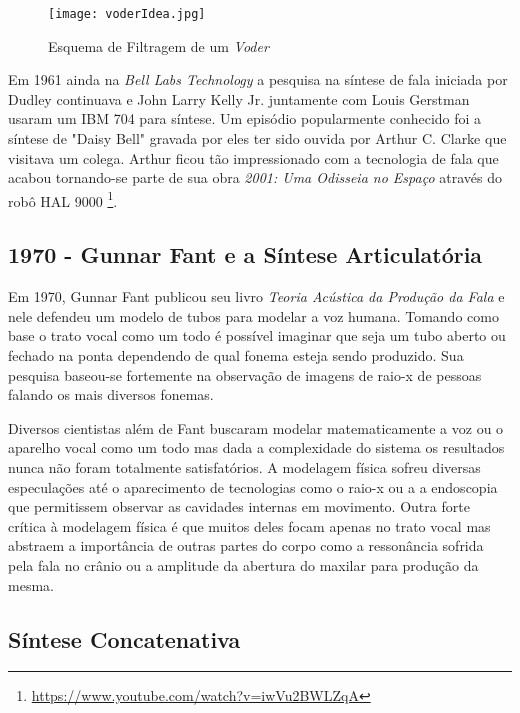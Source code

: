 \begin{figure}
    \centering
    \texttt{[image: voderIdea.jpg]}
    \caption{Esquema de Filtragem de um \textit{Voder}}
    \label{fig:voderIdea}
\end{figure}


Em 1961 ainda na \textit{Bell Labs Technology} a pesquisa na síntese de fala iniciada por Dudley continuava e John Larry Kelly Jr. juntamente com Louis Gerstman usaram um IBM 704 para síntese. Um episódio popularmente conhecido foi a síntese de "Daisy Bell" gravada por eles ter sido ouvida por Arthur C. Clarke que visitava um colega. Arthur ficou tão impressionado com a tecnologia de fala que acabou tornando-se parte de sua obra \emph{2001: Uma Odisseia no Espaço} através do robô HAL 9000 \footnote{\url{https://www.youtube.com/watch?v=iwVu2BWLZqA}}.

\subsection{1970 - Gunnar Fant e a Síntese Articulatória}
Em 1970, Gunnar Fant publicou seu livro \textit{Teoria Acústica da Produção da Fala} \cite{fant1960acoustic} e nele defendeu um modelo de tubos para modelar a voz humana. Tomando como base o trato vocal como um todo é possível imaginar que seja um tubo aberto ou fechado na ponta dependendo de qual fonema esteja sendo produzido. Sua pesquisa baseou-se fortemente na observação de imagens de raio-x de pessoas falando os mais diversos fonemas.

Diversos cientistas além de Fant buscaram modelar matematicamente a voz ou o aparelho vocal como um todo mas dada a complexidade do sistema os resultados nunca não foram totalmente satisfatórios. A modelagem física sofreu diversas especulações até o aparecimento de tecnologias como o raio-x ou a a endoscopia que permitissem observar as cavidades internas em movimento. Outra forte crítica à modelagem física é que muitos deles focam apenas no trato vocal mas abstraem a importância de outras partes do corpo como a ressonância sofrida pela fala no crânio ou a amplitude da abertura do maxilar para produção da mesma.

\subsection{Síntese Concatenativa}

